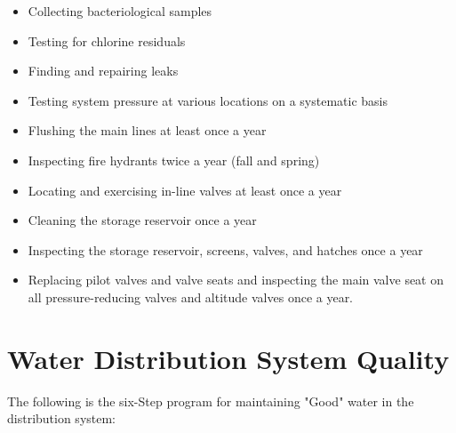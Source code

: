 \documentclass[10pt]{article}
\begin{document}
\begin{itemize}
  \item Collecting bacteriological samples

  \item Testing for chlorine residuals

  \item Finding and repairing leaks

  \item Testing system pressure at various locations on a systematic basis

  \item Flushing the main lines at least once a year

  \item Inspecting fire hydrants twice a year (fall and spring)

  \item Locating and exercising in-line valves at least once a year

  \item Cleaning the storage reservoir once a year

  \item Inspecting the storage reservoir, screens, valves, and hatches once a year

  \item Replacing pilot valves and valve seats and inspecting the main valve seat on all pressure-reducing valves and altitude valves once a year.

\end{itemize}
\section{Water Distribution System Quality}
The following is the six-Step program for maintaining "Good" water in the distribution system:
\end{document}
